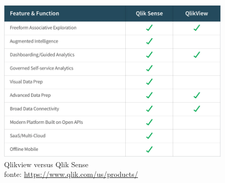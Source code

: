 \begin{figure}[h]
	\centering
	\includegraphics[scale=0.40]{./figures/cap1/qlikview.png}
	\caption{Qlikview versus Qlik Sense\\ fonte: \url{https://www.qlik.com/us/products/}}
\end{figure}





